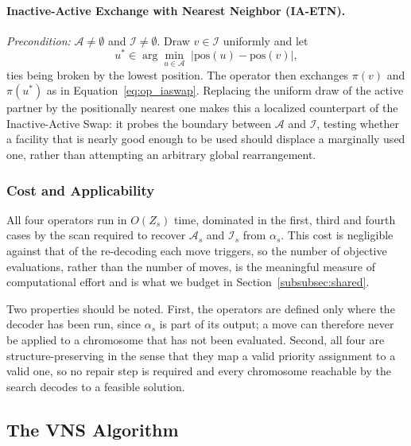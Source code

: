 \documentclass[preprint,12pt,authoryear]{elsarticle}
\begin{document}
\paragraph{Inactive-Active Exchange with Nearest Neighbor (IA-ETN).} \textit{Precondition:} $\mathcal{A} \neq \emptyset$ and $\mathcal{I} \neq \emptyset$. Draw $v \in \mathcal{I}$
uniformly and let
%
\begin{equation}
\label{eq:op_iaetn}
u^{*} \in \arg\min_{u \in \mathcal{A}} \; \bigl| \mathrm{pos}(u) - \mathrm{pos}(v) \bigr| ,
\end{equation}
%
ties being broken by the lowest position. The operator then exchanges $\pi(v)$ and $\pi(u^{*})$ as in Equation~\eqref{eq:op_iaswap}. Replacing the uniform draw of the active partner by
the positionally nearest one makes this a localized counterpart of the Inactive-Active Swap: it probes the boundary between $\mathcal{A}$ and $\mathcal{I}$, testing whether a facility
that is nearly good enough to be used should displace a marginally used one, rather than attempting an arbitrary global rearrangement.

\subsubsection{Cost and Applicability}
\label{subsubsec:op_cost}

All four operators run in $O(Z_s)$ time, dominated in the first, third and fourth cases by the scan required to recover $\mathcal{A}_s$ and $\mathcal{I}_s$ from $\alpha_s$. This cost is
negligible against that of the re-decoding each move triggers, so the number of objective evaluations, rather than the number of moves, is the meaningful measure of computational
effort and is what we budget in Section~\ref{subsubsec:shared}.

Two properties should be noted. First, the operators are defined only where the decoder has been run, since $\alpha_s$ is part of its output; a move can therefore never be applied to a
chromosome that has not been evaluated. Second, all four are structure-preserving in the sense that they map a valid priority assignment to a valid one, so no repair step is required
and every chromosome reachable by the search decodes to a feasible solution.

\subsection{The VNS Algorithm}
\label{subsec:vns}
\end{document}
